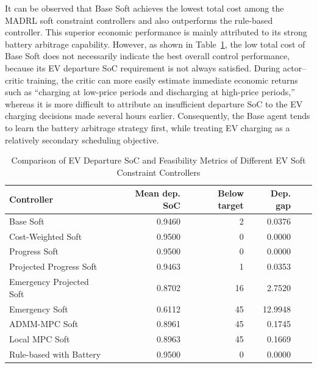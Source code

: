 It can be observed that Base Soft achieves the lowest total cost among the MADRL soft constraint controllers and also outperforms the rule-based controller. This superior economic performance is mainly attributed to its strong battery arbitrage capability. However, as shown in Table~\ref{tab:ch6-soft-ev}, the low total cost of Base Soft does not necessarily indicate the best overall control performance, because its EV departure SoC requirement is not always satisfied. During actor--critic training, the critic can more easily estimate immediate economic returns such as ``charging at low-price periods and discharging at high-price periods,'' whereas it is more difficult to attribute an insufficient departure SoC to the EV charging decisions made several hours earlier. Consequently, the Base agent tends to learn the battery arbitrage strategy first, while treating EV charging as a relatively secondary scheduling objective.

\begin{table}[htbp]
  \centering
  \caption{Comparison of EV Departure SoC and Feasibility Metrics of Different EV Soft Constraint Controllers}
  \label{tab:ch6-soft-ev}
  \begin{tabular}{lrrrrr}
    \toprule
    Controller & Mean dep. SoC  & Below target & Dep. gap\\
    \midrule
    Base Soft & 0.9460  & 2 & 0.0376 \\
    Cost-Weighted Soft & 0.9500  & 0 & 0.0000  \\
    Progress Soft & 0.9500  & 0 & 0.0000  \\
    Projected Progress Soft & 0.9463  & 1 & 0.0353  \\
    Emergency Projected Soft & 0.8702  & 16 & 2.7520  \\
    Emergency Soft & 0.6112  & 45 & 12.9948  \\
    ADMM-MPC Soft & 0.8961  & 45 & 0.1745  \\
    Local MPC Soft & 0.8963  & 45 & 0.1669 \\
    Rule-based with Battery & 0.9500  & 0 & 0.0000  \\
    \bottomrule
  \end{tabular}
\end{table}

